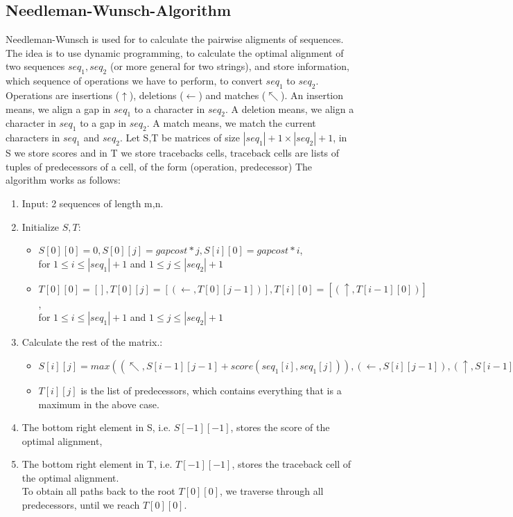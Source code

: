 \subsection{Needleman-Wunsch-Algorithm}
\label{sec:needleman}
Needleman-Wunsch is used for to calculate the pairwise aligments of sequences.
The idea is to use dynamic programming, to calculate the optimal alignment of two sequences $seq_1,seq_2$ (or more general for two strings),
and store information, which sequence of operations we have to perform, to convert $seq_1$ to $seq_2$.
Operations are insertions ($\uparrow$), deletions ($\leftarrow$) and matches ($\nwarrow$). An insertion means, we align a gap in $seq_1$ to a character in $seq_2$.
A deletion means, we align a character in $seq_1$ to a gap in $seq_2$.
A match means, we match the current characters in $seq_1$ and $seq_2$.
Let S,T be matrices of size $|seq_1|+1 \times |seq_2|+1$, in S we store scores and in T we store tracebacks cells,
traceback cells are lists of tuples of predecessors of a cell, of the form (operation, predecessor)
The algorithm works as follows:
\begin{enumerate}
  \item Input: 2 sequences of length m,n.
  \item Initialize $S,T$:
    \begin{itemize}
      \item $S[0][0] = 0, S[0][j] = gapcost * j, S[i][0] = gapcost * i $,\\ for $1 \leq i \leq |seq_1| +1$ and $1 \leq j \leq |seq_2| + 1$
      \item $T[0][0] = [], T[0][j] = [(\leftarrow,T[0][j-1])], T[i][0] = [(\uparrow,T[i-1][0])]$,\\
      for $1 \leq i \leq |seq_1| +1$ and $1 \leq j \leq |seq_2| + 1$
    \end{itemize}
  \item Calculate the rest of the matrix.:
    \begin{itemize}
      \item $S[i][j] = max((\nwarrow, S[i-1][j-1] + score(seq_1[i],seq_1[j])), (\leftarrow, S[i][j-1]), (\uparrow, S[i-1][j]))$
      \item $T[i][j]$ is the list of predecessors, which contains everything that is a maximum in the above case.
    \end{itemize}
  \item The bottom right element in S, i.e. $S[-1][-1]$, stores the score of the optimal alignment,
  \item The bottom right element in T, i.e. $T[-1][-1]$, stores the traceback cell of the optimal alignment.\\
  To obtain all paths back to the root $T[0][0]$, we traverse through all predecessors, until we reach $T[0][0]$.
\end{enumerate}

